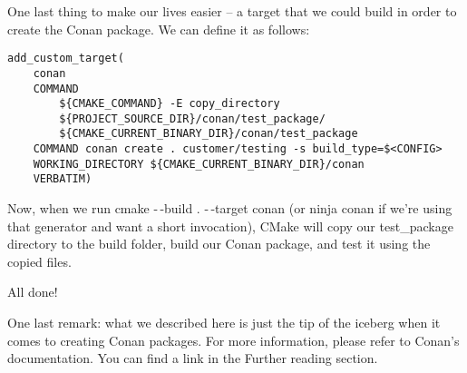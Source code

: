 One last thing to make our lives easier – a target that we could build in order to create the Conan package. We can define it as follows:

\begin{lstlisting}[style=styleCMake]
add_custom_target(
	conan
	COMMAND
		${CMAKE_COMMAND} -E copy_directory
		${PROJECT_SOURCE_DIR}/conan/test_package/
		${CMAKE_CURRENT_BINARY_DIR}/conan/test_package
	COMMAND conan create . customer/testing -s build_type=$<CONFIG>
	WORKING_DIRECTORY ${CMAKE_CURRENT_BINARY_DIR}/conan
	VERBATIM)
\end{lstlisting}

Now, when we run cmake -\,-build . -\,-target conan (or ninja conan if we're using that generator and want a short invocation), CMake will copy our test\_package directory to the build folder, build our Conan package, and test it using the copied files.

All done!

\begin{tcolorbox}[colback=blue!5!white,colframe=blue!75!black, title=Note]
\hspace*{0.7cm}One last remark: what we described here is just the tip of the iceberg when it comes to creating Conan packages. For more information, please refer to Conan's documentation. You can find a link in the Further reading section.
\end{tcolorbox}








